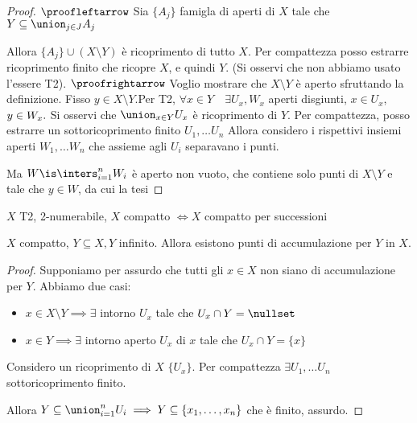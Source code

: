 \begin{proof}
 $\proofleftarrow$
 Sia $ \{ A_j  \}$ famigla di aperti di $X$ tale che $Y\subseteq \union_{j\in J}A_j$
 
 Allora $ \{ A_j  \} \cup (X\setminus Y)$ è ricoprimento di tutto $X$.
 Per compattezza posso estrarre ricoprimento finito che ricopre $X$, e quindi $Y$. (Si osservi che non abbiamo usato l'essere T2).
 $\proofrightarrow$
 Voglio mostrare che $X\setminus Y$ è aperto sfruttando la definizione.
 Fisso $y\in X\setminus Y$.Per T2, $\forall x\in Y\quad \exists U_x, W_x$ aperti disgiunti, $x\in U_x$, $y\in W_x.\\$ 
 Si osservi che $\union_{x\in Y}U_x$ è ricoprimento di $Y$. Per compattezza, posso estrarre un sottoricoprimento finito $U_1,\dots U_n$
 Allora considero i rispettivi insiemi aperti $W_1,\dots W_n$ che assieme agli $U_i$ separavano i punti.
  
 Ma $W\is \inters_{i=1}^nW_i$ è aperto non vuoto, che contiene solo punti di $X\setminus Y$ e tale che $y\in W$, da cui la tesi  
 \end{proof}
\begin{prop}
 $X$ T2, 2-numerabile, $ X$ compatto $\iff X$ compatto per successioni
\end{prop}
 \begin{lemma}
  $X$ compatto, $Y\subseteq X, Y$ infinito. Allora esistono punti di accumulazione per $Y$ in $X$.
 \end{lemma}
 \begin{proof}
  Supponiamo per assurdo che tutti gli $x\in X$ non siano di accumulazione per $Y$. Abbiamo due casi:
	\begin{itemize}
	 \item $x\in X\setminus Y\implies \exists$ intorno $U_x$ tale che $U_x\cap Y = \nullset$
	 \item $x\in Y\implies \exists$ intorno aperto $U_x$ di $x$ tale che $U_x\cap Y = \{ x \}$
	\end{itemize}
  Considero un ricoprimento di $X$ $\{ U_x \}$. Per compattezza $\exists U_1,\dots U_n$ sottoricoprimento finito.
  
  Allora $Y\subseteq \union_{i=1}^nU_i\implies Y\subseteq \left \{ x_1,\dots,x_n\right \}$ che è finito, assurdo.
 \end{proof}







